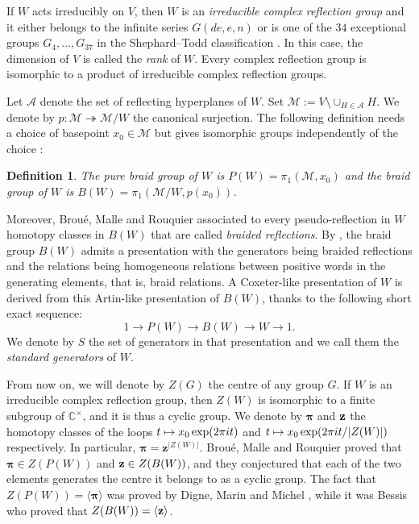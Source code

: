 \documentclass[11pt, reqno]{amsart}
\newcommand{\cA}{\mathcal{A}}
\newcommand{\cM}{\mathcal{M}}
\numberwithin{equation}{section}
\newtheorem{definition}[theorem]{Definition}
\theoremstyle{remark}
\begin{document}
	If $W$ acts irreducibly on $V$, then $W$ is an \emph{irreducible complex reflection group} and it either belongs to the infinite series $G(de,e,n)$ or is one of the $34$ exceptional groups $G_4,\ldots,G_{37}$ in the Shephard--Todd classification \cite{ShTo}. In this case, the dimension of $V$ is called the \emph{rank} of $W$. Every complex reflection group is isomorphic to a product of irreducible complex reflection groups.
	
	Let  $\cA$ denote the set of reflecting hyperplanes of $W$. Set $\mathcal{M}:=V\setminus \cup_{H\in \mathcal{A}}H$. We denote by $p:\cM\twoheadrightarrow \cM/W$ the canonical surjection. 	The following definition needs a choice of basepoint $x_0\in \cM$ but gives isomorphic groups independently of the choice \cite{BMR}:
	
	\begin{definition}{\rm
			The  \emph{pure braid group} of $W$ is $P(W)=\pi_1(\cM,x_0)$ and the \emph{braid group} of $W$ is $B(W)=\pi_1(\cM/W,p(x_0))$.}
	\end{definition}
	
	
	Moreover, Brou\'e, Malle and Rouquier associated to every pseudo-reflection in $W$ homotopy classes in $B(W)$ that are called \emph{braided reflections}. By  \cite[Theorem 0.1]{Bes2}, the braid group $B(W)$ admits a presentation with the generators being braided reflections and the relations being homogeneous relations between positive words in the generating elements, that is, braid relations. 
	A Coxeter-like presentation of $W$ is derived from this Artin-like presentation of $B(W)$, thanks to the following short exact sequence:
	$$1\rightarrow P(W) \rightarrow B(W) \rightarrow W \rightarrow 1.$$ 
	We denote by $S$ the set of generators in that presentation and we call them the \emph{standard generators} of $W$.
	
	
	
	From now on, we will denote by $Z(G)$ the centre of any group $G$.
	If $W$ is an irreducible complex reflection group, then $Z(W)$ is isomorphic to a finite subgroup of $\mathbb{C}^{\times}$, and it is thus a cyclic group. 
	We denote by $\boldsymbol{\pi}$ and $\boldsymbol{\rm{z}}$ the homotopy classes of the loops $t\mapsto x_0 \,{\rm exp}(2\pi i t)$ and $t\mapsto  x_0\,{\rm exp}(2\pi i t/|Z(W)|)$ respectively. In particular, $\boldsymbol\pi=\mathbf z^{|Z(W)|}$. Brou\'e, Malle and Rouquier \cite[Lemma 2.22 (2)]{BMR} proved that  $\boldsymbol{\pi} \in Z(P(W))$ and $\boldsymbol{{\rm z}} \in Z(B(W))$, and they conjectured that each of the two elements  generates the centre it belongs to as a cyclic group. The fact that $Z(P(W)) = \langle \boldsymbol{\pi} \rangle$ was proved by Digne, Marin and Michel \cite[Theorem 1.2]{DMM}, while it was Bessis \cite[Theorem 12.8]{Bes3} who proved that
	$Z(B(W)) = \langle \boldsymbol{{\rm z}} \rangle$.
	
\end{document}
